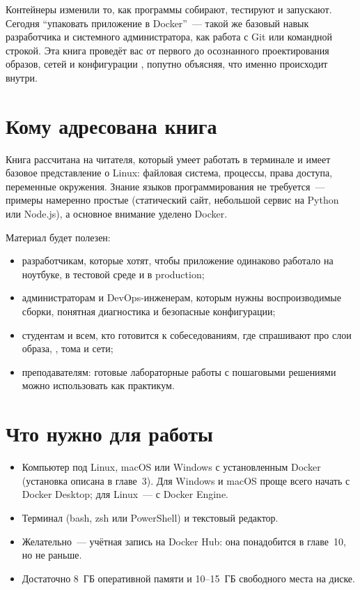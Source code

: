 
Контейнеры изменили то, как программы собирают, тестируют и запускают.
Сегодня \enquote{упаковать приложение в Docker}~--- такой же базовый навык разработчика
и системного администратора, как работа с Git или командной строкой.
Эта книга проведёт вас от первого  до осознанного
проектирования образов, сетей и конфигурации ,
попутно объясняя, что именно происходит внутри.

\section*{Кому адресована книга}

Книга рассчитана на читателя, который умеет работать в терминале и имеет
базовое представление о Linux: файловая система, процессы, права доступа,
переменные окружения. Знание языков программирования не требуется~---
примеры намеренно простые (статический сайт, небольшой сервис на Python
или Node.js), а основное внимание уделено Docker.

Материал будет полезен:

\begin{itemize}
  \item разработчикам, которые хотят, чтобы приложение одинаково работало
        на ноутбуке, в тестовой среде и в production;
  \item администраторам и DevOps-инженерам, которым нужны воспроизводимые
        сборки, понятная диагностика и безопасные конфигурации;
  \item студентам и всем, кто готовится к собеседованиям, где спрашивают
        про слои образа, , тома и сети;
  \item преподавателям: готовые лабораторные работы с пошаговыми решениями
        можно использовать как практикум.
\end{itemize}

\section*{Что нужно для работы}

\begin{itemize}
  \item Компьютер под Linux, macOS или Windows с установленным Docker
        (установка описана в главе~3). Для Windows и macOS проще всего
        начать с Docker Desktop; для Linux~--- с Docker Engine.
  \item Терминал (bash, zsh или PowerShell) и текстовый редактор.
  \item Желательно~--- учётная запись на Docker Hub: она понадобится
        в главе~10, но не раньше.
  \item Достаточно 8~ГБ оперативной памяти и 10--15~ГБ свободного места
        на диске.
\end{itemize}

